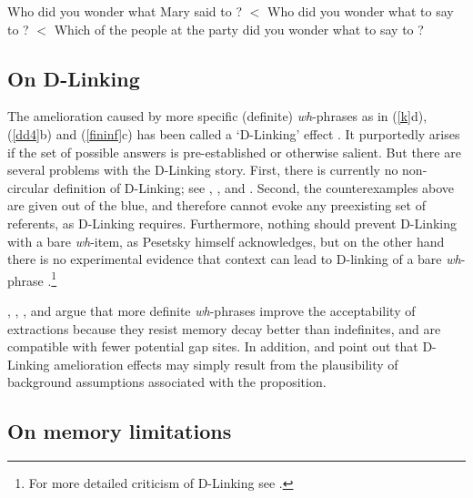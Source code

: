 \documentclass[output=paper
                ,modfonts
                ,nonflat
	        ,collection
	        ,collectionchapter
	        ,collectiontoclongg
 	        ,biblatex
                ,babelshorthands
                ,newtxmath
                ,draftmode
                ,colorlinks, citecolor=brown
]{./langsci/langscibook}
\begin{document}
\eal \label{fininf}
\ex Who did you wonder what Mary said to \spc?  $<$
\ex Who did you wonder what to say to \spc?  $<$
\ex Which of the people at the party did you wonder what to say to \spc? 
\zl

\subsection{On D-Linking}

The amelioration caused by more specific (definite) \emph{wh}-phrases as in  (\ref{k}d), (\ref{dd4}b) and (\ref{fininf}c)  has been called a `D-Linking' effect  \citep{pesetskydlink,pesetskybook}. It purportedly arises if the set of possible answers is pre-established or otherwise salient. But there are several problems with the D-Linking story.   First, there is currently no non-circular definition of D-Linking; see 
\citet[16]{pesetskybook},
 \citet[247--250]{ginzsag}, 
 \citet[33, 39]{chung94} and
\citet[242, 268--271]{levhubook}. Second, the counterexamples above are given out of the blue, and therefore cannot evoke any preexisting set of referents, as D-Linking 
requires.   Furthermore, nothing should prevent D-Linking with a bare \emph{wh}-item, as Pesetsky himself acknowledges, but on the other hand there is no experimental evidence that context can lead to D-linking of a bare \emph{wh}-phrase \citep{sprousediss07,villata}.\footnote{For more detailed criticism of D-Linking see \citet{hof2007}.}

 \citet{kluenderkustas}, \citet{saghof}, \citet{philcls}, \citet{philipt07} and \citet{hofsaglang} argue that more definite \emph{wh}-phrases improve the  acceptability of  extractions because they resist memory decay better than indefinites, and 
 are compatible with fewer potential gap sites. In addition, \citet{kroch89} and \citet[270]{levhubook} point out that D-Linking amelioration effects  may simply result from  the plausibility of background assumptions associated with the proposition. 

\subsection{On memory limitations}
 
\end{document}
